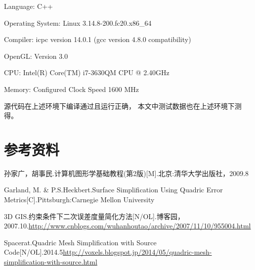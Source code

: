 Language: C++

Operating System: Linux 3.14.8-200.fc20.x86\_64

Compiler: icpc version 14.0.1 (gcc version 4.8.0 compatibility)

OpenGL: Version 3.0

CPU: Intel(R) Core(TM) i7-3630QM CPU @ 2.40GHz

Memory: Configured Clock Speed 1600 MHz 

源代码在上述环境下编译通过且运行正确，%
本文中测试数据也在上述环境下测得。

\section{参考资料}
\begin{enumerate}[ label={[\arabic*]} ]
\item
孙家广，胡事民.计算机图形学基础教程(第2版)[M].北京:清华大学出版社，2009.8
\item
Garland, M. \& P.S.Heckbert.Surface Simplification Using Quadric Error Metrics[C].Pittsburgh:Carnegie Mellon University
\item
3D GIS.约束条件下二次误差度量简化方法[N/OL].博客园，2007.10.\url{http://www.cnblogs.com/wuhanhoutao/archive/2007/11/10/955004.html}
\item
Spacerat.Quadric Mesh Simplification with Source Code[N/OL].2014.5\url{http://voxels.blogspot.jp/2014/05/quadric-mesh-simplification-with-source.html}

\end{enumerate}


